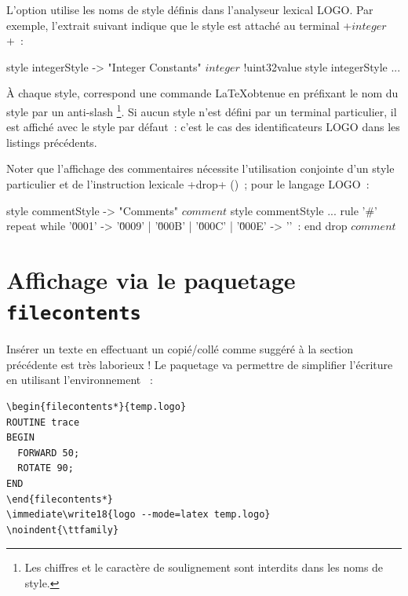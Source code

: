 
L'option  utilise les noms de style définis dans l'analyseur lexical LOGO. Par exemple, l'extrait suivant indique que le style  est attaché au terminal \ggsq+$integer$+~:

\begin{galgas4}
style integerStyle -> "Integer Constants"
$integer$ !uint32value style integerStyle ...
\end{galgas4}

À chaque style, correspond une commande \LaTeX obtenue en préfixant le nom du style par un anti-slash \tpp{\textbackslash}\footnote{Les chiffres et le caractère de soulignement \tpp{\_} sont interdits dans les noms de style.}. Si aucun style n'est défini par un terminal particulier, il est affiché avec le style par défaut~: c'est le cas des identificateurs LOGO dans les listings précédents.

Noter que l'affichage des commentaires nécessite l'utilisation conjointe d'un style particulier et de l'instruction lexicale \ggsq+drop+ ()~; pour le langage LOGO~:

\begin{galgas4}
style commentStyle -> "Comments"
$comment$ style commentStyle ...
rule '#' {
  repeat
  while '\u0001' -> '\u0009' | '\u000B' | '\u000C' | '\u000E' -> '\uFFFD'~:
  end
  drop $comment$
}
\end{galgas4}







\section{Affichage via le paquetage \texttt{f{}ilecontents}}

Insérer un texte en effectuant un copié/collé comme suggéré à la section précédente est très laborieux ! Le paquetage  va permettre de simplifier l'écriture en utilisant l'environnement ~:

\begin{verbatim}
\begin{filecontents*}{temp.logo}
ROUTINE trace
BEGIN
  FORWARD 50;
  ROTATE 90;
END
\end{filecontents*}
\immediate\write18{logo --mode=latex temp.logo}
\noindent{\ttfamily}
\end{verbatim}

